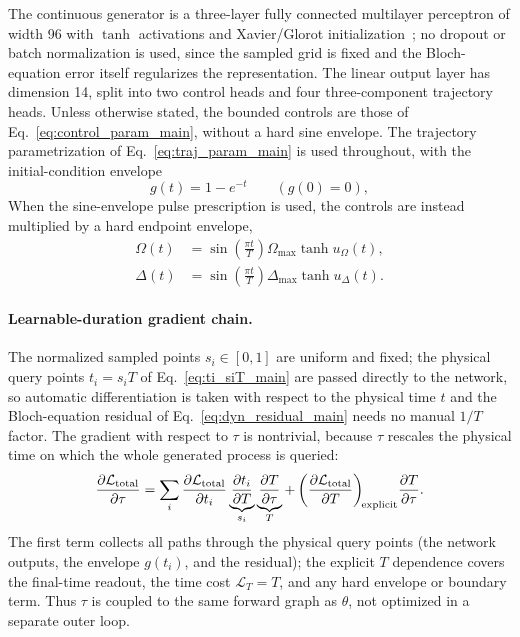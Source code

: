 \documentclass[aps,prx,reprint,superscriptaddress,nofootinbib,longbibliography,floatfix,showkeys]{revtex4-2}
\newcommand{\LT}{\mathcal L_T}
\newcommand{\Ltotal}{\mathcal L_{\rm total}}
\begin{document}
The continuous generator is a three-layer fully connected multilayer perceptron of width 96 with $\tanh$ activations and Xavier/Glorot initialization~\cite{Glorot2010Understanding}; no dropout or batch normalization is used, since the sampled grid is fixed and the Bloch-equation error itself regularizes the representation.  The linear output layer has dimension 14, split into two control heads and four three-component trajectory heads.  Unless otherwise stated, the bounded controls are those of Eq.~\eqref{eq:control_param_main}, without a hard sine envelope.  The trajectory parametrization of Eq.~\eqref{eq:traj_param_main} is used throughout, with the initial-condition envelope
\begin{equation}
    g(t)=1-e^{-t}\qquad(g(0)=0),
\end{equation}
When the sine-envelope pulse prescription is used, the controls are instead multiplied by a hard endpoint envelope,
\begin{equation}
    \begin{aligned}
    \Omega(t)&=\sin\!\left(\tfrac{\pi t}{T}\right)\Omega_{\max}\tanh u_\Omega(t),\\
    \Delta(t)&=\sin\!\left(\tfrac{\pi t}{T}\right)\Delta_{\max}\tanh u_\Delta(t).
    \end{aligned}
\end{equation}

\paragraph{Learnable-duration gradient chain.}
The normalized sampled points $s_i\in[0,1]$ are uniform and fixed; the physical query points $t_i=s_iT$ of Eq.~\eqref{eq:ti_siT_main} are passed directly to the network, so automatic differentiation is taken with respect to the physical time $t$ and the Bloch-equation residual of Eq.~\eqref{eq:dyn_residual_main} needs no manual $1/T$ factor.  The gradient with respect to $\tau$ is nontrivial, because $\tau$ rescales the physical time on which the whole generated process is queried:
\begin{equation}
    \frac{\partial \Ltotal}{\partial \tau}
    =\sum_i\frac{\partial \Ltotal}{\partial t_i}\underbrace{\frac{\partial t_i}{\partial T}}_{s_i}\underbrace{\frac{\partial T}{\partial \tau}}_{T}
    +\left(\frac{\partial \Ltotal}{\partial T}\right)_{\!\rm explicit}\!\frac{\partial T}{\partial \tau}.
    \label{eq:supp_tau_grad_schematic}
\end{equation}
The first term collects all paths through the physical query points (the network outputs, the envelope $g(t_i)$, and the residual); the explicit $T$ dependence covers the final-time readout, the time cost $\LT=T$, and any hard envelope or boundary term.  Thus $\tau$ is coupled to the same forward graph as $\theta$, not optimized in a separate outer loop.
\end{document}
